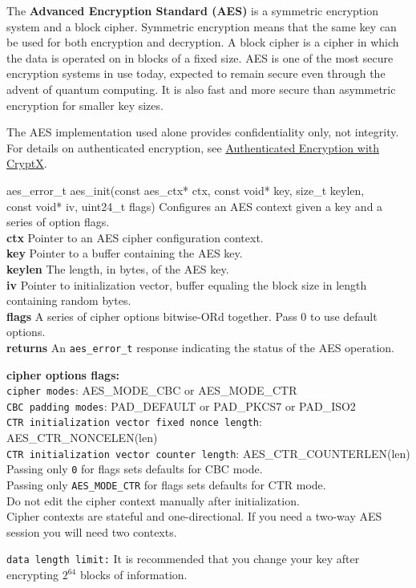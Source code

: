 \documentclass[titlepage]{article}
\begin{document}
			The \textbf{Advanced Encryption Standard (AES)} is a symmetric encryption system and a block cipher. Symmetric encryption means that the same key can be used for both encryption and decryption. A block cipher is a cipher in which the data is operated on in blocks of a fixed size. AES is one of the most secure encryption systems in use today, expected to remain secure even through the advent of quantum computing. It is also fast and more secure than asymmetric encryption for smaller key sizes.
			
			The AES implementation used alone provides confidentiality only, not integrity. For details on authenticated encryption, see \underline{\hyperref[sec:auth]{Authenticated Encryption with CryptX}}.
				\begin{functionspec}[]{aes\_error\_t aes\_init(const aes\_ctx* ctx, const void* key, size\_t keylen,\\\tabto{35mm}const void* iv, uint24\_t flags)}
					Configures an AES context given a key and a series of option flags.\\
					\textbf{ctx} Pointer to an AES cipher configuration context.\\
					\textbf{key} Pointer to a buffer containing the AES key.\\
					\textbf{keylen} The length, in bytes, of the AES key.\\
					\textbf{iv} Pointer to initialization vector, buffer equaling the block size in length containing random bytes.\\
					\textbf{flags} A series of cipher options bitwise-ORd together. Pass 0 to use default options.\\
					\textbf{returns} An \texttt{aes\_error\_t} response indicating the status of the AES operation.
					\begin{notespec}
						\textbf{cipher options flags:}\\
						\texttt{cipher modes}: AES\_MODE\_CBC or AES\_MODE\_CTR\\
						\texttt{CBC padding modes}: PAD\_DEFAULT or PAD\_PKCS7 or PAD\_ISO2\\
						\texttt{CTR initialization vector fixed nonce length}: AES\_CTR\_NONCELEN(len)\\
						\texttt{CTR initialization vector counter length}: AES\_CTR\_COUNTERLEN(len)\\
						Passing only \texttt{0} for flags sets defaults for CBC mode.\\
						Passing only \texttt{AES\_MODE\_CTR} for flags sets defaults for CTR mode.\\
						Do not edit the cipher context manually after initialization.\\
						Cipher contexts are stateful and one-directional. If you need a two-way AES session you will need two contexts.
					\end{notespec}
				\begin{warningspec}
					\texttt{data length limit:} It is recommended that you change your key after encrypting $2^{64}$ blocks of information.
				\end{warningspec}
				\end{functionspec}
\end{document}
